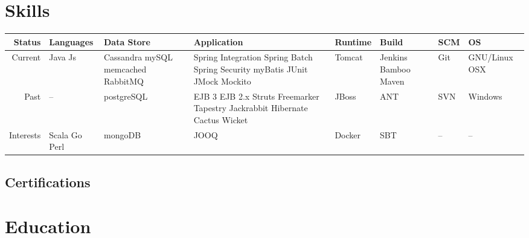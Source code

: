 \documentclass[a4paper]{article}
\begin{document}
\section*{\LARGE{Skills}} 


\begin{tabular}{r | p{1.6cm} | p{2cm} | p{2.8cm} | p{1.2cm} | p{1.2cm} | p{0.8cm} | p{2cm}}
	Status & Languages & Data Store & Application & Runtime & Build & SCM & OS \\ \hline
	Current & Java \newline Js & Cassandra \newline mySQL \newline memcached \newline RabbitMQ & Spring Integration \newline Spring Batch \newline Spring Security \newline myBatis \newline JUnit \newline JMock \newline Mockito & Tomcat & Jenkins \newline Bamboo \newline Maven & Git & GNU/Linux \newline OSX \\ \hline
Past & --  & postgreSQL & EJB 3 \newline EJB 2.x \newline Struts \newline Freemarker \newline Tapestry \newline Jackrabbit \newline Hibernate \newline Cactus \newline Wicket & JBoss & ANT & SVN & Windows \\ \hline
	Interests & Scala \newline Go \newline Perl & mongoDB & JOOQ & Docker & SBT & -- & --
\end{tabular}

\subsection*{\LARGE{Certifications}}


\section*{\LARGE{Education}} 
\end{document}
